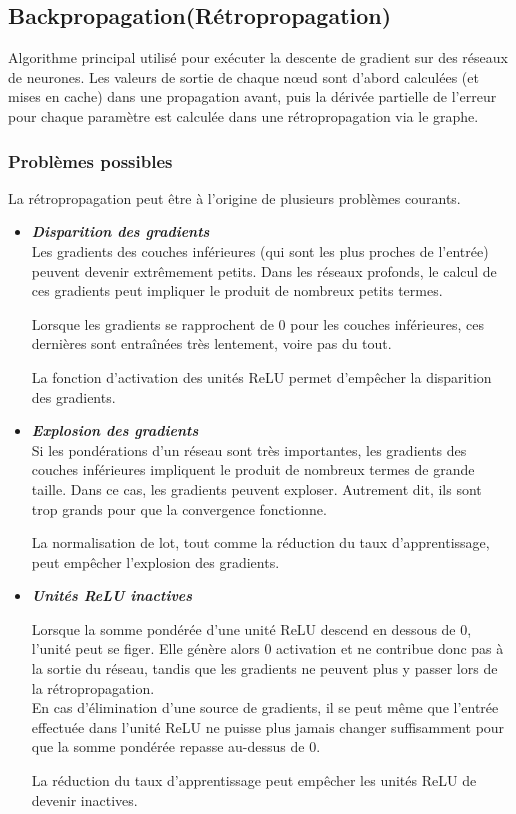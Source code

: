 \documentclass[french]{article}
\begin{document}
\subsection{Backpropagation(Rétropropagation)}

Algorithme principal utilisé pour exécuter la descente de gradient sur des réseaux de neurones. Les valeurs de sortie de chaque nœud sont d'abord calculées (et mises en cache) dans une propagation avant, puis la dérivée partielle de l'erreur pour chaque paramètre est calculée dans une rétropropagation via le graphe.

\subsubsection{Problèmes possibles}

La rétropropagation peut être à l'origine de plusieurs problèmes courants.

\begin{itemize}[label=$\star$]
	\item \textbf{\textit{Disparition des gradients}}\\
	Les gradients des couches inférieures (qui sont les plus proches de l'entrée) peuvent devenir extrêmement petits. Dans les réseaux profonds, le calcul de ces gradients peut impliquer le produit de nombreux petits termes.
	
	Lorsque les gradients se rapprochent de 0 pour les couches inférieures, ces dernières sont entraînées très lentement, voire pas du tout.
	
	La fonction d'activation des unités ReLU permet d'empêcher la disparition des gradients.\\
	
	\item \textbf{\textit{Explosion des gradients}}\\
	Si les pondérations d'un réseau sont très importantes, les gradients des couches inférieures impliquent le produit de nombreux termes de grande taille. Dans ce cas, les gradients peuvent exploser. Autrement dit, ils sont trop grands pour que la convergence fonctionne.
	
	La normalisation de lot, tout comme la réduction du taux d'apprentissage, peut empêcher l'explosion des gradients.\\
	
	\item \textbf{\textit{Unités ReLU inactives}}
	
	Lorsque la somme pondérée d'une unité ReLU descend en dessous de 0, l'unité peut se figer. Elle génère alors 0 activation et ne contribue donc pas à la sortie du réseau, tandis que les gradients ne peuvent plus y passer lors de la rétropropagation.\\ En cas d'élimination d'une source de gradients, il se peut même que l'entrée effectuée dans l'unité ReLU ne puisse plus jamais changer suffisamment pour que la somme pondérée repasse au-dessus de 0.
	
	La réduction du taux d'apprentissage peut empêcher les unités ReLU de devenir inactives.
	
\end{itemize}
\newpage
\end{document}
